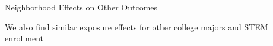 \documentclass[aspectratio=169,xcolor=dvipsnames]{beamer}
\newenvironment{wideitemize}{\itemize\addtolength{\itemsep}{10pt}}{\enditemize}
\begin{document}

\begin{frame}{Neighborhood Effects on Other Outcomes}
\begin{wideitemize}
    \item We also find similar exposure effects for other college majors and STEM enrollment 
\end{wideitemize}
\end{frame}
\end{document}
